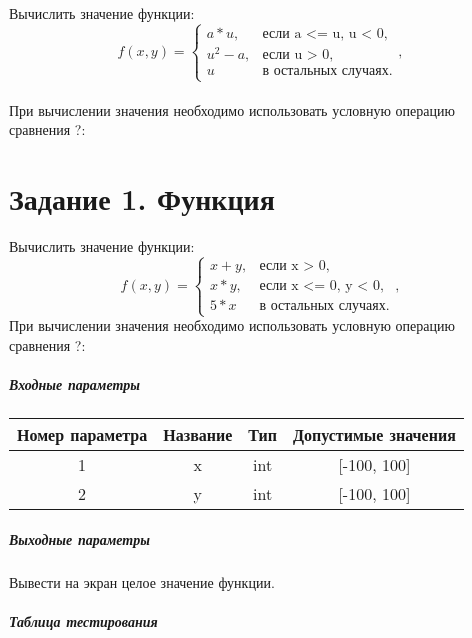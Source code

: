Вычислить значение функции:\\
\begin{equation*}f(x,y) =\begin{cases}a * u, & \textrm{если a <= u, u < 0,}\\u^2 - a, & \textrm{если u > 0,}\\u & \textrm{в остальных случаях.}\end{cases},\end{equation*}\\
При вычислении значения необходимо использовать условную операцию сравнения ?:



\chapter*{Задание 1. Функция}

Вычислить значение функции:\\\n\begin{equation*}f(x,y) =\begin{cases}x + y, & \textrm{если x > 0,}\\x * y, & \textrm{если x <= 0, y < 0,}\\5 * x & \textrm{в остальных случаях.}\end{cases},\end{equation*}
При вычислении значения необходимо использовать условную операцию сравнения ?:

\paragraph{Входные параметры}

\begin{tabular}{ |c|c|c|c| }
\hline
Номер параметра & Название & Тип & Допустимые значения \\ 
 \hline
1 & x & int & [-100, 100] \\ 
 \hline
2 & y & int & [-100, 100] \\ 
 \hline

\end{tabular}


\paragraph{Выходные параметры}

Вывести на экран целое значение функции.

\paragraph{Таблица тестирования}


